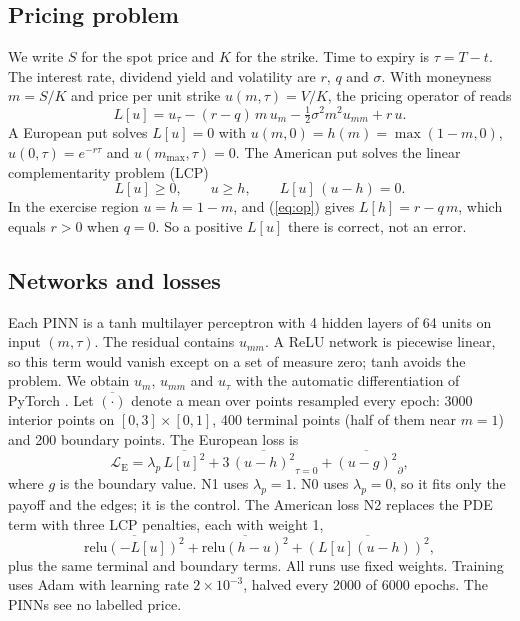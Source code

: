 \documentclass[conference]{IEEEtran}
\begin{document}
\subsection{Pricing problem}
We write $S$ for the spot price and $K$ for the strike. Time to expiry is $\tau=T-t$. The interest rate, dividend yield and volatility are $r$, $q$ and $\sigma$. With moneyness $m=S/K$ and price per unit strike $u(m,\tau)=V/K$, the pricing operator of \cite{black1973pricing,merton1973theory} reads
\begin{equation}
L[u]=u_\tau-(r-q)\,m\,u_m-\tfrac12\sigma^2m^2u_{mm}+r\,u. \label{eq:op}
\end{equation}
A European put solves $L[u]=0$ with $u(m,0)=h(m)=\max(1-m,0)$, $u(0,\tau)=e^{-r\tau}$ and $u(m_{\max},\tau)=0$. The American put solves the linear complementarity problem (LCP)
\begin{equation}
L[u]\ge0,\qquad u\ge h,\qquad L[u]\,(u-h)=0. \label{eq:lcp}
\end{equation}
In the exercise region $u=h=1-m$, and (\ref{eq:op}) gives $L[h]=r-q\,m$, which equals $r>0$ when $q=0$. So a positive $L[u]$ there is correct, not an error.

\subsection{Networks and losses}
Each PINN is a tanh multilayer perceptron with 4 hidden layers of 64 units on input $(m,\tau)$. The residual contains $u_{mm}$. A ReLU network is piecewise linear, so this term would vanish except on a set of measure zero; tanh avoids the problem. We obtain $u_m$, $u_{mm}$ and $u_\tau$ with the automatic differentiation of PyTorch \cite{paszke2019pytorch}. Let $\overline{(\cdot)}$ denote a mean over points resampled every epoch: 3000 interior points on $[0,3]\times[0,1]$, 400 terminal points (half of them near $m=1$) and 200 boundary points. The European loss is
\begin{equation}
\mathcal L_{\mathrm{E}}=\lambda_{p}\,\overline{L[u]^2}+3\,\overline{(u-h)^2}_{\tau=0}+\overline{(u-g)^2}_{\partial}, \label{eq:le}
\end{equation}
where $g$ is the boundary value. N1 uses $\lambda_p=1$. N0 uses $\lambda_p=0$, so it fits only the payoff and the edges; it is the control. The American loss N2 replaces the PDE term with three LCP penalties, each with weight 1,
\begin{equation}
\overline{\mathrm{relu}(-L[u])^2}+\overline{\mathrm{relu}(h-u)^2}+\overline{(L[u](u-h))^2}, \label{eq:la}
\end{equation}
plus the same terminal and boundary terms. All runs use fixed weights. Training uses Adam with learning rate $2\times10^{-3}$, halved every 2000 of 6000 epochs. The PINNs see no labelled price.
\end{document}
